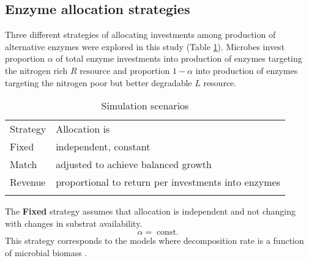 \subsection{ Enzyme allocation strategies 
\label{sec:AllocStrategies}}

Three different strategies of allocating investments among production of
alternative enzymes were explored in this study (Table
\ref{tab:AllocStrategies}). Microbes invest proportion $\alpha$ of total enzyme
investments into production of enzymes targeting the nitrogen rich $R$ resource
and proportion $1 - \alpha$ into production of enzymes targeting the nitrogen
poor but better degradable $L$ resource.

\begin{table}[t]
\caption{Simulation scenarios \label{tab:AllocStrategies}}
\vskip4mm
\centering
\begin{tabular}{ll}
\tophline
Strategy &  Allocation is \\
\middlehline
Fixed & independent, constant \\
Match & adjusted to achieve balanced growth \\
Revenue & proportional to return per investments into enzymes \\
\bottomhline
\end{tabular}
\end{table}


The \textbf{Fixed} strategy assumes that allocation is independent
and not changing with changes in substrat availability.
\begin{equation} 
\label{eq:allocFixed}
\alpha = \operatorname{const.}
\end{equation}
This strategy corresponds to the models where decomposition rate is a function
of microbial biomass \citep{Wutzler08}.
 
